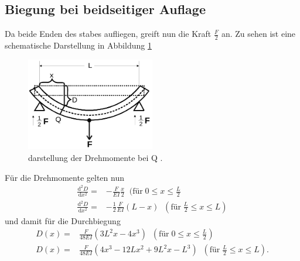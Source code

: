 \subsection{Biegung bei beidseitiger Auflage}
Da beide Enden des stabes aufliegen, greift nun die Kraft $\frac{F}{2}$ an.
Zu sehen ist eine schematische Darstellung in Abbildung \ref{fig:Beidseitige_Einspannung}
\begin{figure}
  \centering
  \includegraphics[width=0.5\textwidth]{Beidseitige_Einspannung.png}
  \caption{darstellung der Drehmomente bei Q \cite{sample} .}
  \label{fig:Beidseitige_Einspannung}
\end{figure}
Für die Drehmomente gelten nun
\begin{align}
  \frac{\text{d}^2D}{\text{d}x^2}=&-\frac{F}{EI}\frac{x}{2}\;\;(\text{für}\;0\le x \le \frac{L}{2}\\
  \frac{\text{d}^2D}{\text{d}x^2}=&-\frac{1}{2}\frac{F}{EI}(L-x)\;\; (\text{für}\; \frac{L}{2} \le x \le L)
\end{align}
und damit für die Durchbiegung
\begin{align}
  D(x)=&\frac{F}{48EI}\left(3L^2x-4x^3\right)\;\;(\text{für}\;0\le x \le \frac{L}{2})\\
  D(x)=&\frac{F}{48EI}\left(4x^3-12Lx^2+9L^2x-L^3\right)\;\; (\text{für}\; \frac{L}{2} \le x \le L).
\end{align}
\cite{sample}
